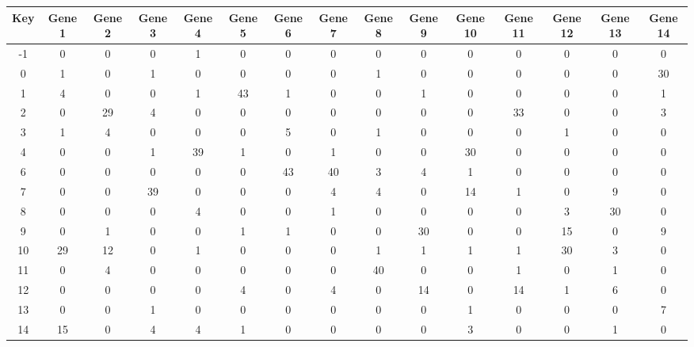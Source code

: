 \begin{tabular}{|c|c|c|c|c|c|c|c|c|c|c|c|c|c|c|}
\hline
Key & Gene 1 & Gene 2 & Gene 3 & Gene 4 & Gene 5 & Gene 6 & Gene 7 & Gene 8 & Gene 9 & Gene 10 & Gene 11 & Gene 12 & Gene 13 & Gene 14 \\
\hline
-1 & 0 & 0 & 0 & 1 & 0 & 0 & 0 & 0 & 0 & 0 & 0 & 0 & 0 & 0 \\
0 & 1 & 0 & 1 & 0 & 0 & 0 & 0 & 1 & 0 & 0 & 0 & 0 & 0 & 30 \\
1 & 4 & 0 & 0 & 1 & 43 & 1 & 0 & 0 & 1 & 0 & 0 & 0 & 0 & 1 \\
2 & 0 & 29 & 4 & 0 & 0 & 0 & 0 & 0 & 0 & 0 & 33 & 0 & 0 & 3 \\
3 & 1 & 4 & 0 & 0 & 0 & 5 & 0 & 1 & 0 & 0 & 0 & 1 & 0 & 0 \\
4 & 0 & 0 & 1 & 39 & 1 & 0 & 1 & 0 & 0 & 30 & 0 & 0 & 0 & 0 \\
6 & 0 & 0 & 0 & 0 & 0 & 43 & 40 & 3 & 4 & 1 & 0 & 0 & 0 & 0 \\
7 & 0 & 0 & 39 & 0 & 0 & 0 & 4 & 4 & 0 & 14 & 1 & 0 & 9 & 0 \\
8 & 0 & 0 & 0 & 4 & 0 & 0 & 1 & 0 & 0 & 0 & 0 & 3 & 30 & 0 \\
9 & 0 & 1 & 0 & 0 & 1 & 1 & 0 & 0 & 30 & 0 & 0 & 15 & 0 & 9 \\
10 & 29 & 12 & 0 & 1 & 0 & 0 & 0 & 1 & 1 & 1 & 1 & 30 & 3 & 0 \\
11 & 0 & 4 & 0 & 0 & 0 & 0 & 0 & 40 & 0 & 0 & 1 & 0 & 1 & 0 \\
12 & 0 & 0 & 0 & 0 & 4 & 0 & 4 & 0 & 14 & 0 & 14 & 1 & 6 & 0 \\
13 & 0 & 0 & 1 & 0 & 0 & 0 & 0 & 0 & 0 & 1 & 0 & 0 & 0 & 7 \\
14 & 15 & 0 & 4 & 4 & 1 & 0 & 0 & 0 & 0 & 3 & 0 & 0 & 1 & 0 \\
\hline
\end{tabular}